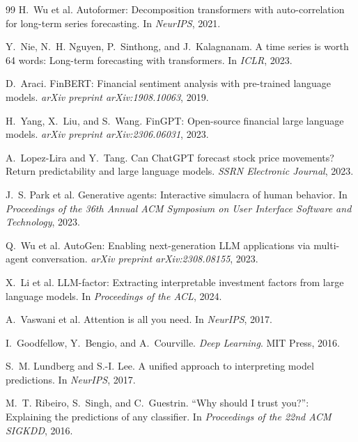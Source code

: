 \documentclass[12pt,a4paper,oneside]{report}
\begin{document}
\begin{thebibliography}{99}
H.~Wu et al.
\newblock Autoformer: Decomposition transformers with auto-correlation
  for long-term series forecasting.
\newblock In \emph{NeurIPS}, 2021.

Y.~Nie, N.~H. Nguyen, P.~Sinthong, and J.~Kalagnanam.
\newblock A time series is worth 64 words: Long-term forecasting with
  transformers.
\newblock In \emph{ICLR}, 2023.

D.~Araci.
\newblock FinBERT: Financial sentiment analysis with pre-trained
  language models.
\newblock \emph{arXiv preprint arXiv:1908.10063}, 2019.

H.~Yang, X.~Liu, and S.~Wang.
\newblock FinGPT: Open-source financial large language models.
\newblock \emph{arXiv preprint arXiv:2306.06031}, 2023.

A.~Lopez-Lira and Y.~Tang.
\newblock Can ChatGPT forecast stock price movements? Return
  predictability and large language models.
\newblock \emph{SSRN Electronic Journal}, 2023.

J.~S. Park et al.
\newblock Generative agents: Interactive simulacra of human behavior.
\newblock In \emph{Proceedings of the 36th Annual ACM Symposium on
  User Interface Software and Technology}, 2023.

Q.~Wu et al.
\newblock AutoGen: Enabling next-generation LLM applications via
  multi-agent conversation.
\newblock \emph{arXiv preprint arXiv:2308.08155}, 2023.

X.~Li et al.
\newblock LLM-factor: Extracting interpretable investment factors
  from large language models.
\newblock In \emph{Proceedings of the ACL}, 2024.

A.~Vaswani et al.
\newblock Attention is all you need.
\newblock In \emph{NeurIPS}, 2017.

I.~Goodfellow, Y.~Bengio, and A.~Courville.
\newblock \emph{Deep Learning}.
\newblock MIT Press, 2016.

S.~M. Lundberg and S.-I. Lee.
\newblock A unified approach to interpreting model predictions.
\newblock In \emph{NeurIPS}, 2017.

M.~T. Ribeiro, S.~Singh, and C.~Guestrin.
\newblock ``Why should I trust you?'': Explaining the predictions of
  any classifier.
\newblock In \emph{Proceedings of the 22nd ACM SIGKDD}, 2016.


\end{thebibliography}
\end{document}
